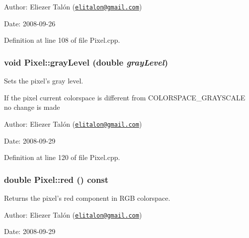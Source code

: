 \begin{Desc}
\item[Author:]Eliezer Talón (\href{mailto:elitalon@gmail.com}{\tt elitalon@gmail.com}) \end{Desc}
\begin{Desc}
\item[Date:]2008-09-26 \end{Desc}


Definition at line 108 of file Pixel.cpp.\hypertarget{class_pixel_03f96954bfc27f8f8810e8c6e58828f8}{
\subsubsection[grayLevel]{\setlength{\rightskip}{0pt plus 5cm}void Pixel::grayLevel (double {\em grayLevel})}}
\label{class_pixel_03f96954bfc27f8f8810e8c6e58828f8}


Sets the pixel's gray level. 

If the pixel current colorspace is different from COLORSPACE\_\-GRAYSCALE no change is made

\begin{Desc}
\item[Author:]Eliezer Talón (\href{mailto:elitalon@gmail.com}{\tt elitalon@gmail.com}) \end{Desc}
\begin{Desc}
\item[Date:]2008-09-29 \end{Desc}


Definition at line 120 of file Pixel.cpp.\hypertarget{class_pixel_52542702e90cafc9c29713c23cd35e8f}{
\subsubsection[red]{\setlength{\rightskip}{0pt plus 5cm}double Pixel::red () const}}
\label{class_pixel_52542702e90cafc9c29713c23cd35e8f}


Returns the pixel's red component in RGB colorspace. 

\begin{Desc}
\item[Author:]Eliezer Talón (\href{mailto:elitalon@gmail.com}{\tt elitalon@gmail.com}) \end{Desc}
\begin{Desc}
\item[Date:]2008-09-29 \end{Desc}



